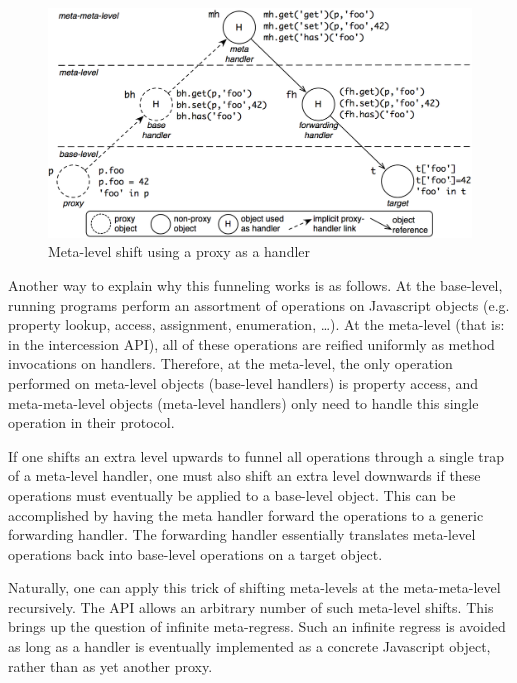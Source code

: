 \documentclass{sig-alternate}
\begin{document}
\begin{figure}[htbp]
  \centering
    \includegraphics[width=1.0\columnwidth]{MetaLevelShifting.png}
  \caption{Meta-level shift using a proxy as a handler}
  \label{fig:shift}
\end{figure}


Another way to explain why this funneling works is as follows. At the base-level, running programs perform an assortment of operations on Javascript objects (e.g. property lookup, access, assignment, enumeration, \ldots). At the meta-level (that is: in the intercession API), all of these operations are reified uniformly as method invocations on handlers. Therefore, at the meta-level, the only operation performed on meta-level objects (base-level handlers) is property access, and meta-meta-level objects (meta-level handlers) only need to handle this single operation in their protocol.

If one shifts an extra level upwards to funnel all operations through a single trap of a meta-level handler, one must also shift an extra level downwards if these operations must eventually be applied to a base-level object. This can be accomplished by having the meta handler forward the operations to a generic forwarding handler. The forwarding handler essentially translates meta-level operations back into base-level operations on a target object.

Naturally, one can apply this trick of shifting meta-levels at the meta-meta-level recursively. The API allows an arbitrary number of such meta-level shifts. This brings up the question of infinite meta-regress. Such an infinite regress is avoided as long as a handler is eventually implemented as a concrete Javascript object, rather than as yet another proxy.
\end{document}
